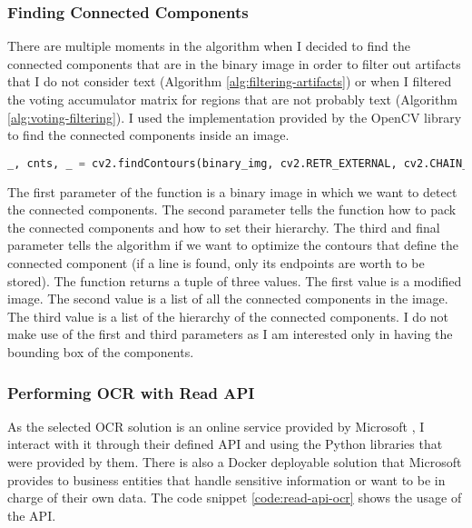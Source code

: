 \subsubsection{Finding Connected Components}

There are multiple moments in the algorithm when I decided to find the connected components that are in the binary image in order to filter out artifacts that I do not consider text (Algorithm \ref{alg:filtering-artifacts}) or when I filtered the voting accumulator matrix for regions that are not probably text (Algorithm \ref{alg:voting-filtering}). I used the implementation provided by the OpenCV library \cite{site:opencv-connected_components} to find the connected components inside an image.

\begin{lstlisting}[language=Python, label=code:connected_components, caption={Connected Components}]
    _, cnts, _ = cv2.findContours(binary_img, cv2.RETR_EXTERNAL, cv2.CHAIN_APPROX_SIMPLE)
\end{lstlisting}

The first parameter of the function is a binary image in which we want to detect the connected components. The second parameter tells the function how to pack the connected components and how to set their hierarchy. The third and final parameter tells the algorithm if we want to optimize the contours that define the connected component (if a line is found, only its endpoints are worth to be stored). The function returns a tuple of three values. The first value is a modified image. The second value is a list of all the connected components in the image. The third value is a list of the hierarchy of the connected components. I do not make use of the first and third parameters as I am interested only in having the bounding box of the components.

\subsubsection{Performing OCR with Read API}

As the selected OCR solution is an online service provided by Microsoft \cite{site:Microsoft_Cognitive_Services-Read_API-OCR}, I interact with it through their defined API and using the Python libraries \cite{site:python-pip_azure_cognitive_services} that were provided by them. There is also a Docker deployable solution that Microsoft provides to business entities that handle sensitive information or want to be in charge of their own data. The code snippet \ref{code:read-api-ocr} shows the usage of the API.

